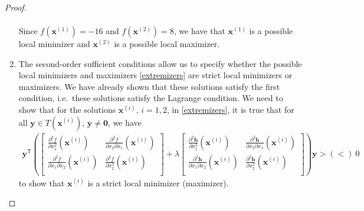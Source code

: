 \documentclass[12pt]{article}
\theoremstyle{definition}
\newcommand{\vc}[1]{\boldsymbol{#1}}
\newcommand{\tran}{\mathsf{T}}
\begin{document}
\begin{proof}
\begin{enumerate}
\begin{align}
      \end{align}
      Since $f(\vc{x}^{(1)}) = -16$ and $f(\vc{x}^{(2)}) = 8$, we have that $\vc{x}^{(1)}$ is a possible local
      minimizer and $\vc{x}^{(2)}$ is a possible local maximizer.
    \item The second-order sufficient conditions allow us to specify whether
      the possible local minimizers and maximizers \eqref{extremizers} are strict local minimizers or maximizers.
      We have already shown that these solutions satisfy the first condition, i.e.\ these solutions satisfy the Lagrange condition.
      We need to show that for the solutions $\vc{x}^{(i)}$, $i=1,2$, in \eqref{extremizers}, it is true that
      for all $\vc{y} \in T(\vc{x}^{(i)})$, $\vc{y}\neq \vc{0}$, we have
      \begin{align*}
        \vc{y}^\tran \left(
          \begin{bmatrix}
            \frac{\partial^2 f}{\partial x_1^2}(\vc{x}^{(i)}) & \frac{\partial^2 f}{\partial x_2\partial x_1}(\vc{x}^{(i)}) \\
            \frac{\partial^2 f}{\partial x_1\partial x_2}(\vc{x}^{(i)}) & \frac{\partial^2 f}{\partial x_2^2}(\vc{x}^{(i)}) \\
          \end{bmatrix} + \lambda
          \begin{bmatrix}
            \frac{\partial^2 \vc{h}}{\partial x_1^2}(\vc{x}^{(i)}) & \frac{\partial^2 \vc{h}}{\partial x_2\partial x_1}(\vc{x}^{(i)}) \\
            \frac{\partial^2 \vc{h}}{\partial x_1\partial x_2}(\vc{x}^{(i)}) & \frac{\partial^2 \vc{h}}{\partial x_2^2}(\vc{x}^{(i)}) \\
          \end{bmatrix}
        \right) \vc{y} > (<)\ 0
      \end{align*}
      to show that $\vc{x}^{(i)}$ is a strict local minimizer (maximizer).


\end{enumerate}
\end{proof}
\end{document}
